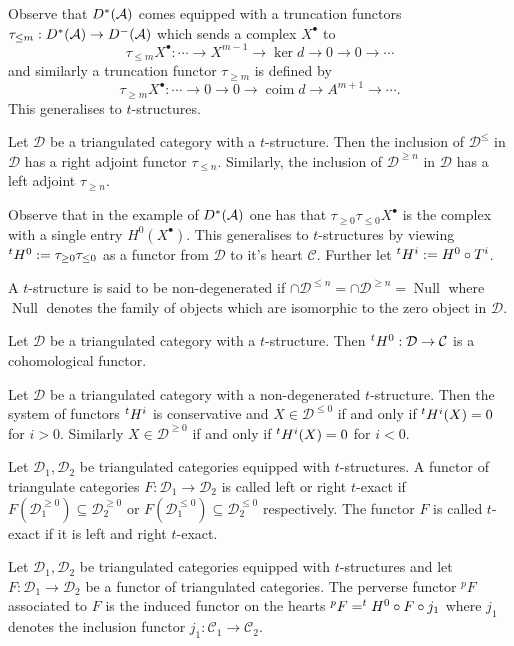 Observe that $D^*(\AA)$ comes equipped with a truncation functors
$\tau_{\leq m}:D^*(\AA)\to D^-(\AA)$ which sends a complex $X^\bullet$ to
$$\tau_{\leq m}X^\bullet : \cdots \to X^{m-1} \to \ker d \to 0 \to 0 \to \cdots$$
and similarly a truncation functor $\tau_{\geq m}$ is defined by
$$\tau_{\geq m}X^\bullet: \cdots \to 0 \to 0 \to \operatorname{coim} d \to A^{m+1}\to \cdots.$$
This generalises to $t$-structures.
\begin{proposition}
  Let $\mathcal{D}$ be a triangulated category with a $t$-structure.
  Then the inclusion of $\mathcal{D}^{\leq}$ in $\mathcal{D}$ has a right adjoint functor $\tau_{\leq n}$.
  Similarly, the inclusion of $\mathcal{D}^{\geq n}$ in $\mathcal{D}$ has a left adjoint $\tau_{\geq n}$.
\end{proposition}
Observe that in the example of $D^*(\AA)$ one has that $\tau_{\geq 0} \tau_{\leq 0} X^\bullet$ is the complex with a single entry $H^0(X^\bullet)$.
This generalises to $t$-structures by viewing $\tH^0:= \tau_{\geq 0}\tau_{\leq 0}$ as a functor from $\mathcal{D}$ to it's heart $\mathcal{C}$.
Further let $\tH^i:= H^0 \circ T^i$.
\begin{definition}
  A $t$-structure is said to be non-degenerated if $\cap \mathcal{D}^{\leq n} = \cap \mathcal{D}^{\geq n}= \operatorname{Null}$ where $\operatorname{Null}$ denotes the family of objects which are isomorphic to the zero object in $\mathcal{D}$.
\end{definition}
\begin{proposition}
  Let $\mathcal{D}$ be a triangulated category with a $t$-structure. Then $\tH^0:\mathcal{D}\to \mathcal{C}$ is a cohomological functor.
\end{proposition}
\begin{proposition}
  Let $\mathcal{D}$ be a triangulated category with a non-degenerated $t$-structure. Then the system of functors $\tH^i$ is conservative and $X\in \mathcal{D}^{\leq 0}$ if and only if $\tH^i(X) = 0$ for $i>0$. Similarly $X\in \mathcal{D}^{\geq 0}$ if and only if $\tH^i(X)= 0$ for $i<0$.
\end{proposition}
\begin{definition}
  Let $\mathcal{D}_1,\mathcal{D}_2$ be triangulated categories equipped with $t$-structures. A functor of triangulate categories $F:\mathcal{D}_1\to \mathcal{D}_2$ is called left or right $t$-exact if $F(\mathcal{D}_1^{\geq 0}) \subseteq \mathcal{D}_2^{\geq 0}$ or $F(\mathcal{D}_1^{\leq 0}) \subseteq \mathcal{D}_2^{\leq 0}$ respectively.
  The functor $F$ is called $t$-exact if it is left and right $t$-exact.
\end{definition}
\begin{definition}
  Let $\mathcal{D}_1,\mathcal{D}_2$ be triangulated categories equipped with $t$-structures and let $F:\mathcal{D}_1 \to \mathcal{D}_2$ be a functor of triangulated categories.
  The perverse functor $^pF$ associated to $F$ is the induced functor on the hearts $^pF = \tH^0 \circ F \circ j_1$ where $j_1$ denotes the inclusion functor $j_1:\mathcal{C}_1\to \mathcal{C}_2$.
\end{definition}
\begin{proposition}

\end{proposition}
